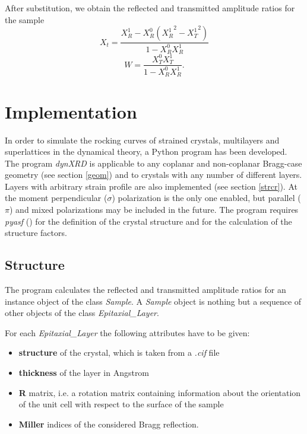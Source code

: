\documentclass[12pt,oneside,notitlepage,abstracton,a4paper]{scrartcl}
\begin{document}
After substitution, we obtain the reflected and transmitted amplitude ratios for the sample
\begin{equation}\label{refl}
 X_t=\frac{X_R^1-X_R^0({X_R^1}^2-{X_T^1}^2)}{1-X_R^0 X_R^1}
\end{equation}
\begin{equation}\label{trans}
 W=\frac{X_T^0 X_T^1}{1-X_R^0 X_R^1}.
\end{equation}





\section{Implementation}

In order to simulate the rocking curves of strained crystals, multilayers and superlattices in the dynamical theory, a Python program has been developed. The program \textit{dynXRD} is applicable to any coplanar and non-coplanar Bragg-case geometry (see section \ref{geom}) and to crystals with any number of different layers. Layers with arbitrary strain profile are also implemented (see section \ref{strcr}). At the moment perpendicular ($\sigma$) polarization is the only one enabled, but parallel ($\pi$) and mixed polarizations may be included in the future. The program requires \textit{pyasf} () for the definition of the crystal structure and for the calculation of the structure factors.


\subsection{Structure}
The program calculates the reflected and transmitted amplitude ratios for an instance object of the class \textit{Sample}. A \textit{Sample} object is nothing but a sequence of other objects of the class \textit{Epitaxial\_Layer}.

For each \textit{Epitaxial\_Layer} the following attributes have to be given:
\begin{itemize}
 \item \textbf{structure} of the crystal, which is taken from a \textit{.cif} file
 \item \textbf{thickness} of the layer in Angstrom
 \item \textbf{R} matrix, i.e. a rotation matrix containing information about the orientation of the unit cell with respect to the surface of the sample
 \item \textbf{Miller} indices of the considered Bragg reflection.
\end{itemize}
\end{document}
